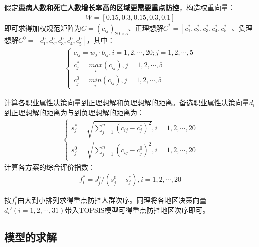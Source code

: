 \documentclass{whutmod}
\begin{document}
    假定\textbf{患病人数和死亡人数增长率高的区域更需要重点防控}，构造权重向量：
     \begin{gather}
     W=[0.15,0.3,0.15,0.3,0.1]
    \end{gather}
    即可求得加权规范矩阵为$C=(c_{ij})_{20 \times 5}$、正理想解$C^{*}=[c_{1}^{*},c_{2}^{*},c_{3}^{*},c_{4}^{*},c_{5}^{*}]$、负理想解$C^{0}=[c_{1}^{0},c_{2}^{0},c_{3}^{0},c_{4}^{0},c_{5}^{0}]$，其中：
     \begin{gather*}
     \left\{\begin{matrix}
     c_{ij}=w_{j} \cdot b_{ij} ,i=1,2,\cdots,20;j=1,2,\cdots,5\\
c_{j}^{*}=\underset{i}{max}(c_{ij}) ,j=1,2,\cdots,5\\
c_{j}^{0}=\underset{i}{min}(c_{ij}) ,j=1,2,\cdots,5
     \end{matrix}\right.
     \end{gather*}
    
    计算各职业属性决策向量到正理想解和负理想解的距离。备选职业属性决策向量$d_{i}$到正理想解的距离为与到负理想解的距离为：
    \begin{gather*}
    \left\{\begin{matrix}
    s_{j}^{*}=\sqrt{\sum_{j=1}^{n}(c_{ij}-c_{j}^*)^{2}},i=1,2,\cdots,20\\
    s_{j}^{0}=\sqrt{\sum_{j=1}^{n}(c_{ij}-c_{j}^{0})^{2}},i=1,2,\cdots,20
     \end{matrix}\right.
    \end{gather*}
    计算各方案的综合评价指数：
    \begin{gather}
    f_{i}^{*}=s_{j}^{0}/(s_{j}^{0}+s_{j}^{*}),i=1,2,\cdots,20
    \end{gather}

    按$f_{i}^{*}$由大到小排列求得重点防控人群次序。同理将各地区决策向量$d_{i}'(i=1,2,\cdots,31)$带入TOPSIS模型可得重点防控地区次序即可。

    \subsection{模型的求解}
\end{document}
